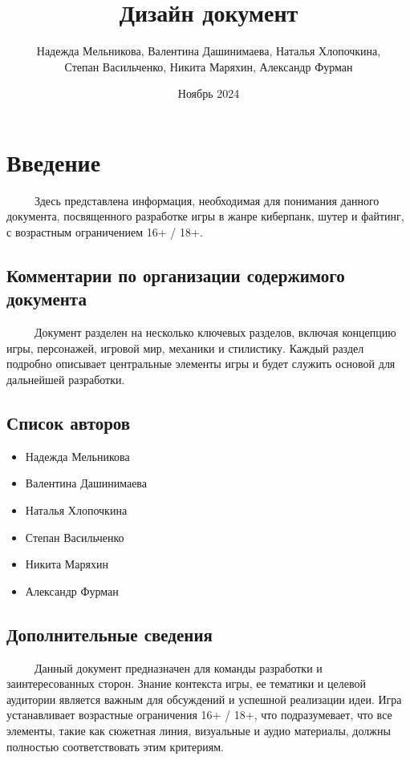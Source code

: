\documentclass{article}
\title{Дизайн документ}
\author{Надежда Мельникова, Валентина Дашинимаева, Наталья Хлопочкина, \\
Степан Васильченко, Никита Маряхин, Александр Фурман}
\date{Ноябрь 2024}
\begin{document}
\maketitle
\renewcommand{\contentsname}{Оглавление}
\tableofcontents

\section{Введение}

\ \ \ \ \ Здесь представлена информация, необходимая для понимания данного документа, посвященного разработке игры в жанре киберпанк, шутер и файтинг, с возрастным ограничением 16+ / 18+.

\subsection{Комментарии по организации содержимого документа}
\ \ \ \ \ Документ разделен на несколько ключевых разделов, включая концепцию игры, персонажей, игровой мир, механики и стилистику. Каждый раздел подробно описывает центральные элементы игры и будет служить основой для дальнейшей разработки.


\subsection{Список авторов}
\begin{itemize}
    \item Надежда Мельникова 
    \item Валентина Дашинимаева 
    \item Наталья Хлопочкина
    \item Степан Васильченко 
    \item Никита Маряхин 
    \item Александр Фурман 
\end{itemize}


\subsection{Дополнительные сведения}
\ \ \ \ \ Данный документ предназначен для команды разработки и заинтересованных сторон. Знание контекста игры, ее тематики и целевой аудитории является важным для обсуждений и успешной реализации идеи. Игра устанавливает возрастные ограничения 16+ / 18+, что подразумевает, что все элементы, такие как сюжетная линия, визуальные и аудио материалы, должны полностью соответствовать этим критериям.
\end{document}
